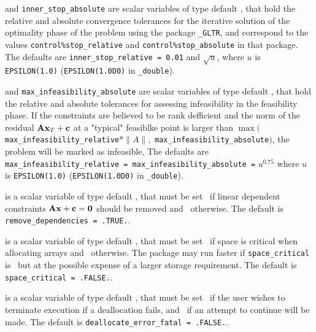 \begin{description}
 and {\tt inner\_stop\_absolute} 
are scalar variables of type default \realdp, 
that hold the relative and absolute convergence tolerances for the
iterative solution of the optimality phase of the problem using the package 
{\tt \libraryname\_GLTR},
and correspond to the values {\tt control\%stop\_relative} and
{\tt control\%stop\_absolute} in that package.
The defaults are 
{\tt inner\_stop\_relative = 0.01}
and  $\sqrt{u}$,
where $u$ is {\tt EPSILON(1.0)} ({\tt EPSILON(1.0D0)} in 
{\tt \fullpackagename\_double}).

 and {\tt max\_infeasibility\_absolute} 
are scalar variables of type default \realdp, 
that hold the relative and absolute tolerances for assessing 
infeasibility in the feasibility phase.  If the constraints are believed to be 
rank defficient and the norm of the residual ${\mathbf{A}} {\mathbf{x}}_T + {\mathbf{c}}$
at a "typical" feasiblke point is larger than
  $\max( ${\tt max\_infeasibility\_relative}$ \ast \| A\|,$ 
{\tt max\_infeasibility\_absolute}$)$,
the problem will be marked as infeasible,
The defaults are 
{\tt max\_infeasibility\_relative = 
\tt max\_infeasibility\_absolute =} $u^{0.75}$
where $u$ is {\tt EPSILON(1.0)} ({\tt EPSILON(1.0D0)} in 
{\tt \fullpackagename\_double}).

 is a scalar variable of type default \logical, 
that must be set \true\ if linear dependent constraints
${\mathbf{A}} {\mathbf{x}} + {\mathbf{c}} = {\mathbf{0}}$ should be removed and \false\ otherwise.
The default is {\tt remove\_dependencies = .TRUE.}.


 is a scalar variable of type default \logical, 
that must be set \true\ if space is critical when allocating arrays
and  \false\ otherwise. The package may run faster if 
{\tt space\_critical} is \false\ but at the possible expense of a larger
storage requirement. The default is {\tt space\_critical = .FALSE.}.

 is a scalar variable of type default \logical, 
that must be set \true\ if the user wishes to terminate execution if
a deallocation  fails, and \false\ if an attempt to continue
will be made. The default is {\tt deallocate\_error\_fatal = .FALSE.}.


\end{description}
